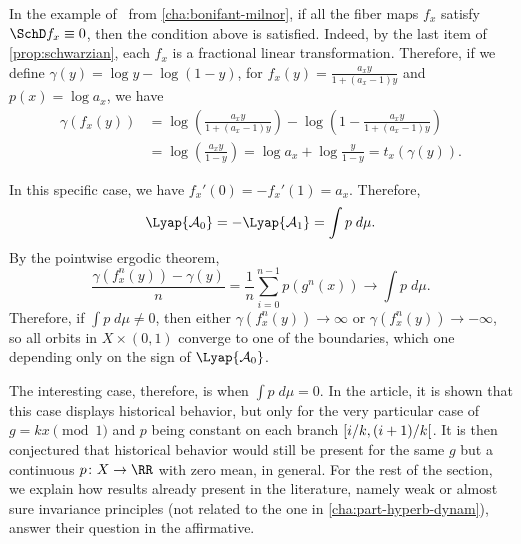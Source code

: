 \documentclass[../main]{subfiles}
\begin{document}
\begin{example}
  In the example of~\citeauthor{bonifantSchwarzianDerivativesCylinder2008} from \cref{cha:bonifant-milnor}, if all the fiber maps \(f_x\) satisfy \(\SchD f_x \equiv 0\), then the condition above is satisfied. Indeed, by the last item of \cref{prop:schwarzian}, each \(f_x\) is a fractional linear transformation. Therefore, if we define \(\gamma(y) = \log y - \log (1 - y)\), for \(f_x(y) = \frac{a_x y}{1 + (a_x - 1)y}\) and \(p(x) = \log a_x\), we have
  \begin{align*}
    \gamma(f_x(y)) &= \log\left(\frac{a_x y}{1 + (a_x - 1)y} \right) - \log\left(1 - \frac{a_x y}{1 + (a_x - 1)y}  \right)\\
    &= \log\left(\frac{a_x y}{1 - y} \right) = \log a_x + \log \frac{y}{1 - y} = t_x(\gamma(y)).
  \end{align*}

  In this specific case, we have \(f_x'(0) = - f_x'(1) = a_x\). Therefore, \[\Lyap{\mathcal{A}_0} = - \Lyap{\mathcal{A}_1} = \int p \;d\mu.\]
  By the pointwise ergodic theorem,
  \begin{equation*}
    \frac{\gamma(f_x^n(y)) - \gamma(y)}{n} = \frac{1}{n}\sum_{i = 0}^{n - 1} p(g^n(x)) \to \int p \;d\mu.
  \end{equation*}
  Therefore, if \(\int p \;d\mu \neq 0\), then either \(\gamma(f_x^n(y)) \to \infty\) or \(\gamma(f_x^n(y)) \to - \infty\), so all orbits in \(X \times (0,1)\) converge to one of the boundaries, which one depending only on the sign of \(\Lyap{\mathcal{A}_0}\).
  
  The interesting case, therefore, is when \(\int p \;d\mu = 0\). In the article, it is shown that this case displays historical behavior, but only for the very particular case of \(g = kx \pmod 1\) and \(p\) being constant on each branch \(\interval[open right]{i/k}{(i + 1)/k}\). It is then conjectured that historical behavior would still be present for the same \(g\) but a continuous \(p \colon X \to \RR\) with zero mean, in general. For the rest of the section, we explain how results already present in the literature, namely weak or almost sure invariance principles (not related to the one in \cref{cha:part-hyperb-dynam}), answer their question in the affirmative.
\end{example}
\end{document}
